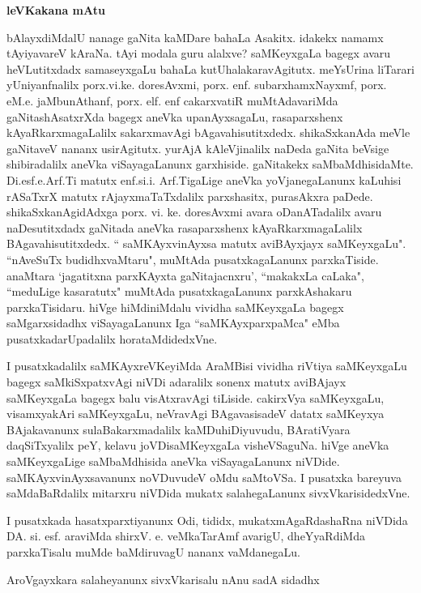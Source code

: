 \begin{center}
\textbf{leVKakana mAtu}
\end{center}

   bAlayxdiMdalU nanage gaNita kaMDare bahaLa Asakitx. idakekx namamx tAyiyavareV kAraNa. tAyi modala 
guru alalxve? saMKeyxgaLa bagegx avaru heVLutitxdadx samaseyxgaLu bahaLa kutUhalakaravAgitutx. 
meYsUrina liTarari yUniyanfnalilx porx.vi.ke. doresAvxmi, porx. enf. subarxhamxNayxmf, porx. eM.e. 
jaMbunAthanf, porx. elf. enf cakarxvatiR muMtAdavariMda gaNitashAsatxrXda bagegx aneVka upanAyxsagaLu, 
rasaparxshenx kAyaR\-karxmagaLalilx sakarxmavAgi bAgavahisutitxdedx. shikaSxkanAda meVle gaNitaveV 
nananx usirAgitutx. yurAjA kAleVjinalilx naDeda gaNita beVsige shibiradalilx aneVka viSayagaLanunx 
garxhiside. gaNitakekx saMbaMdhisidaMte. Di.esf.e.Arf.Ti matutx enf.si.i. Arf.TigaLige aneVka 
yoVjanegaLanunx kaLuhisi rASaTxrX matutx rAjayxmaTaTxdalilx parxshasitx, purasAkxra paDede. shikaSxkanAgidAdxga porx. vi. ke. doresAvxmi avara oDanATadalilx avaru naDesutitxdadx gaNitada aneVka rasaparxshenx kAyaRkarxmagaLalilx BAgavahisutitxdedx. `` saMKAyxvinAyxsa matutx aviBAyxjayx saMKeyxgaLu". ``nAveSuTx budidhxvaMtaru", muMtAda pusatxkagaLanunx parxkaTiside. anaMtara `jagatitxna parxKAyxta gaNitajacnxru', ``makakxLa caLaka", ``meduLige kasaratutx" muMtAda pusatxkagaLanunx parxkAshakaru parxkaTisidaru. hiVge hiMdiniMdalu vividha saMKeyxgaLa bagegx saMgarxsidadhx viSayagaLanunx Iga ``saMKAyxparxpaMca" eMba pusatxkadarUpadalilx horataMdidedxVne. 

I pusatxkadalilx saMKAyxreVKeyiMda AraMBisi vividha riVtiya saMKeyxgaLu bagegx saMkiSxpatxvAgi niVDi adaralilx sonenx matutx aviBAjayx saMKeyxgaLa bagegx balu visAtxravAgi tiLiside. cakirxVya saMKeyxgaLu, visamxyakAri saMKeyxgaLu, neVravAgi BAgavasisadeV datatx saMKeyxya BAjakavanunx sulaBakarxmadalilx kaMDuhiDiyuvudu, BAratiVyara daqSiTxyalilx peY, kelavu joVDisaMKeyxgaLa visheVSaguNa. hiVge aneVka saMKeyxgaLige saMbaMdhisida aneVka viSayagaLanunx niVDide. saMKAyxvinAyxsavanunx noVDuvudeV oMdu saMtoVSa. I pusatxka bareyuva saMdaBaRdalilx mitarxru niVDida mukatx salahegaLanunx sivxVkarisidedxVne.

I pusatxkada hasatxparxtiyanunx Odi, tididx, mukatxmAgaRdashaRna niVDida DA. si. esf. araviMda shirxV. e. veMkaTarAmf avarigU, dheYyaRdiMda parxkaTisalu muMde baMdiruvagU nananx vaMdanegaLu.

AroVgayxkara salaheyanunx sivxVkarisalu nAnu sadA sidadhx
